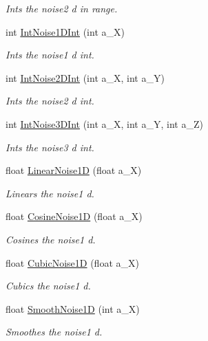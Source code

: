 \begin{DoxyCompactItemize}
\begin{DoxyCompactList}\small\item\em Ints the noise2 d in range. \end{DoxyCompactList}\item 
int \hyperlink{classc_noise_a61d066e035ad91a0918893a830209689}{Int\+Noise1\+D\+Int} (int a\+\_\+X)
\begin{DoxyCompactList}\small\item\em Ints the noise1 d int. \end{DoxyCompactList}\item 
int \hyperlink{classc_noise_ac6ed652b35beab6db2ccb2652fd2f408}{Int\+Noise2\+D\+Int} (int a\+\_\+X, int a\+\_\+Y)
\begin{DoxyCompactList}\small\item\em Ints the noise2 d int. \end{DoxyCompactList}\item 
int \hyperlink{classc_noise_a410db77490efe851aa50c0137b9c570d}{Int\+Noise3\+D\+Int} (int a\+\_\+X, int a\+\_\+Y, int a\+\_\+Z)
\begin{DoxyCompactList}\small\item\em Ints the noise3 d int. \end{DoxyCompactList}\item 
float \hyperlink{classc_noise_a48136470889e5bc9f8e16b1ff63c7e05}{Linear\+Noise1D} (float a\+\_\+X)
\begin{DoxyCompactList}\small\item\em Linears the noise1 d. \end{DoxyCompactList}\item 
float \hyperlink{classc_noise_aa36f7df39e715c681d3ca671013e13ca}{Cosine\+Noise1D} (float a\+\_\+X)
\begin{DoxyCompactList}\small\item\em Cosines the noise1 d. \end{DoxyCompactList}\item 
float \hyperlink{classc_noise_a4fc360258a7d3a50bd7d9e31e702aaee}{Cubic\+Noise1D} (float a\+\_\+X)
\begin{DoxyCompactList}\small\item\em Cubics the noise1 d. \end{DoxyCompactList}\item 
float \hyperlink{classc_noise_ae4539eab0205aa7bacf824005c0307c5}{Smooth\+Noise1D} (int a\+\_\+X)
\begin{DoxyCompactList}\small\item\em Smoothes the noise1 d. \end{DoxyCompactList}\item 

\end{DoxyCompactItemize}

